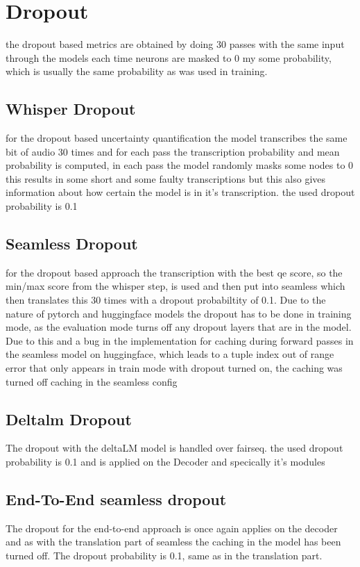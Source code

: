 


\chapter{Dropout}
the dropout based metrics are obtained by doing 30 passes with the same input through the models each time neurons are masked to 0 my some probability, which is usually the same probability as was used in training. 

\section{Whisper Dropout}
for the dropout based uncertainty quantification the model transcribes the same bit of audio 30 times and for each pass the transcription probability and mean probability is computed, in each pass the model randomly masks some nodes to 0
this results in some short and some faulty transcriptions but this also gives information about how certain the model is in it's transcription. the used dropout probability is 0.1 


\section{Seamless Dropout}
for the dropout based approach the transcription with the best qe score, so the min/max score from the whisper step, is used 
and then put into seamless which then translates this 30 times with a dropout probabiltity of 0.1.
Due to the nature of pytorch and huggingface models the dropout has to be done in training mode, as the evaluation mode turns off any dropout layers that are in the model. Due to this and a bug in the implementation for caching during forward passes in the seamless model on huggingface, which leads to a tuple index out of range error that only appears in train mode with dropout turned on, the caching was turned off caching in the seamless config

\section{Deltalm Dropout}
The dropout with the deltaLM model is handled over fairseq. 
the used dropout probability is 0.1 and is applied on the Decoder and specically it's modules



\section{End-To-End seamless dropout}
The dropout for the end-to-end approach is once again applies on the decoder and as with the translation part of seamless the caching in the model has been turned off. The dropout probability is 0.1, same as in the translation part.


